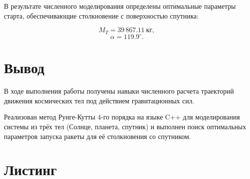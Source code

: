 \documentclass[14pt,a4paper]{extarticle}
\theoremstyle{plain}
\begin{document}
	В результате численного моделирования определены оптимальные параметры старта, обеспечивающие столкновение с поверхностью спутника:
	
	\begin{equation}
		M_{T} = 39\,867.11\ \text{кг},
		\nonumber
	\end{equation}
	\begin{equation}
		\alpha = 119.9^{\circ}.
		\nonumber
	\end{equation}
	
	\newpage
	\section{Вывод}
	
	В ходе выполнения работы получены навыки численного расчета траекторий движения космических тел под действием гравитационных сил.
	
	Реализован метод Рунге-Кутты 4-го порядка на языке C++ для моделирования системы из трёх тел (Солнце, планета, спутник) и выполнен поиск оптимальных параметров запуска ракеты для её столкновения со спутником.

	\newpage
	\section{Листинг}
	
\end{document}
